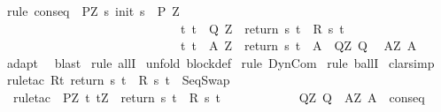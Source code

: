 \begin{isabellebody}
%
\isadelimproof
%
\endisadelimproof
%
\isatagproof
{}\isamarkupfalse%
\ {\isacharparenleft}rule\ conseq\ {\isacharbrackleft}\ P{\isacharprime}{\isacharequal}{\isachardoublequoteopen}{\isasymlambda}Z{\isachardot}\ {\isacharbraceleft}s{\isachardot}\ init\ s\ {\isasymin}\ P{\isacharprime}\ Z\ {\isasymand}\ \isanewline
\ \ \ \ \ \ \ \ \ \ \ \ \ \ \ \ \ \ \ \ \ \ \ \ \ \ \ \ \ {\isacharparenleft}{\isasymforall}t{\isachardot}\ t\ {\isasymin}\ Q{\isacharprime}\ Z\ {\isasymlongrightarrow}\ return\ s\ t\ {\isasymin}\ R\ s\ t{\isacharparenright}\ {\isasymand}\isanewline
\ \ \ \ \ \ \ \ \ \ \ \ \ \ \ \ \ \ \ \ \ \ \ \ \ \ \ \ \ {\isacharparenleft}{\isasymforall}t{\isachardot}\ t\ {\isasymin}\ A{\isacharprime}\ Z\ {\isasymlongrightarrow}\ return\ s\ t\ {\isasymin}\ A{\isacharparenright}{\isacharbraceright}{\isachardoublequoteclose}\ \ Q{\isacharprime}{\isacharequal}{\isachardoublequoteopen}{\isasymlambda}Z{\isachardot}\ Q{\isachardoublequoteclose}\ \ \isanewline
A{\isacharprime}{\isacharequal}{\isachardoublequoteopen}{\isasymlambda}Z{\isachardot}\ A{\isachardoublequoteclose}{\isacharbrackright}{\isacharparenright}\isanewline
{}\isamarkupfalse%
\ {}\isanewline
{}\isamarkupfalse%
\ adapt\isanewline
{}\isamarkupfalse%
\ \ blast\isanewline
{}\isamarkupfalse%
\ {\isacharparenleft}rule\ allI{\isacharparenright}\isanewline
{}\isamarkupfalse%
\ {\isacharparenleft}unfold\ block{\isacharunderscore}def{\isacharparenright}\isanewline
{}\isamarkupfalse%
\ {\isacharparenleft}rule\ DynCom{\isacharparenright}\isanewline
{}\isamarkupfalse%
\ {\isacharparenleft}rule\ ballI{\isacharparenright}\isanewline
{}\isamarkupfalse%
\ clarsimp\isanewline
{}\isamarkupfalse%
\ {\isacharparenleft}rule{\isacharunderscore}tac\ R{\isacharequal}{\isachardoublequoteopen}{\isacharbraceleft}t{\isachardot}\ return\ s\ t\ {\isasymin}\ R\ s\ t{\isacharbraceright}{\isachardoublequoteclose}\ \ SeqSwap\ {\isacharparenright}\isanewline
{}\isamarkupfalse%
\ \ {\isacharparenleft}rule{\isacharunderscore}tac\ \ P{\isacharprime}{\isacharequal}{\isachardoublequoteopen}{\isasymlambda}Z{\isacharprime}{\isachardot}\ {\isacharbraceleft}t{\isachardot}\ t{\isacharequal}Z{\isacharprime}\ {\isasymand}\ return\ s\ t\ {\isasymin}\ R\ s\ t{\isacharbraceright}{\isachardoublequoteclose}\ \ \isanewline
\ \ \ \ \ \ \ \ \ \ Q{\isacharprime}{\isacharequal}{\isachardoublequoteopen}{\isasymlambda}Z{\isacharprime}{\isachardot}\ Q{\isachardoublequoteclose}\ \ A{\isacharprime}{\isacharequal}{\isachardoublequoteopen}{\isasymlambda}Z{\isacharprime}{\isachardot}\ A{\isachardoublequoteclose}\ \ conseq{\isacharparenright}\isanewline

\end{isabellebody}
